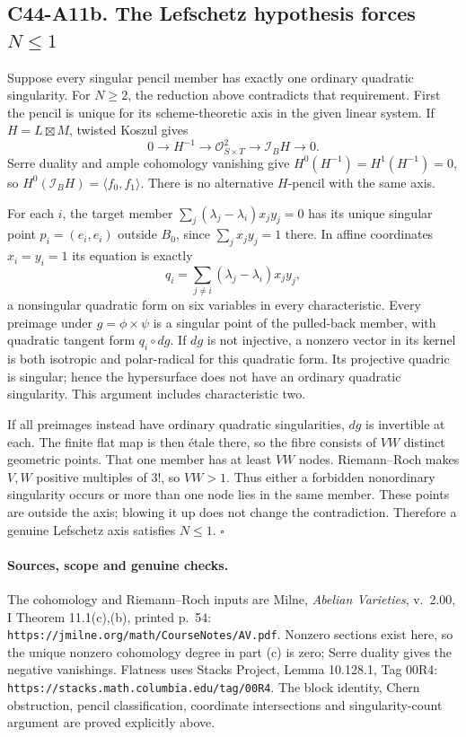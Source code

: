 \documentclass[11pt]{article}
\theoremstyle{remark}\newtheorem{remark}[theorem]{Remark}
\begin{document}
\subsection*{C44-A11b. The Lefschetz hypothesis forces $N\le1$}

Suppose every singular pencil member has exactly one ordinary
quadratic singularity. For $N\ge2$, the reduction above contradicts
that requirement.
First the pencil is unique for its scheme-theoretic axis in the
given linear system. If $H=L\boxtimes M$, twisted Koszul gives
\[
 0\longrightarrow H^{-1}\longrightarrow\mathcal O_{S\times T}^2
                    \longrightarrow\mathcal I_BH\longrightarrow0.
\]
Serre duality and ample cohomology vanishing give
$H^0(H^{-1})=H^1(H^{-1})=0$, so
$H^0(\mathcal I_BH)=\langle f_0,f_1\rangle$.
There is no alternative $H$-pencil with the same axis.

For each $i$, the target member
$\sum_j(\lambda_j-\lambda_i)x_jy_j=0$ has its unique singular
point $p_i=(e_i,e_i)$ outside $B_0$, since $\sum_jx_jy_j=1$ there.
In affine coordinates $x_i=y_i=1$ its equation is exactly
\[
                    q_i=\sum_{j\ne i}(\lambda_j-\lambda_i)x_jy_j,
                                                               \tag{A11b.1}
\]
a nonsingular quadratic form on six variables in every
characteristic.
Every preimage under $g=\phi\times\psi$ is a singular point of
the pulled-back member, with quadratic tangent form $q_i\circ dg$.
If $dg$ is not injective, a nonzero vector in its kernel is both
isotropic and polar-radical for this quadratic form. Its
projective quadric is singular; hence the hypersurface does not
have an ordinary quadratic singularity. This argument includes
characteristic two.

If all preimages instead have ordinary quadratic singularities,
$dg$ is invertible at each. The finite flat map is then \'etale
there, so the fibre consists of $VW$ distinct geometric points.
That one member has at least $VW$ nodes. Riemann--Roch makes
$V,W$ positive multiples of $3!$, so $VW>1$.
Thus either a forbidden nonordinary singularity occurs or more
than one node lies in the same member. These points are outside
the axis; blowing it up does not change the contradiction.
Therefore a genuine Lefschetz axis satisfies $N\le1$.
\hfill$\square$

\paragraph{Sources, scope and genuine checks.}
The cohomology and Riemann--Roch inputs are Milne,
\emph{Abelian Varieties}, v.~2.00, I Theorem 11.1(c),(b),
printed p.~54:
\texttt{https://jmilne.org/math/CourseNotes/AV.pdf}.
Nonzero sections exist here, so the unique nonzero cohomology
degree in part (c) is zero; Serre duality gives the negative
vanishings. Flatness uses Stacks Project, Lemma 10.128.1,
Tag 00R4: \texttt{https://stacks.math.columbia.edu/tag/00R4}.
The block identity, Chern obstruction, pencil classification,
coordinate intersections and singularity-count argument are
proved explicitly above.
\end{document}
